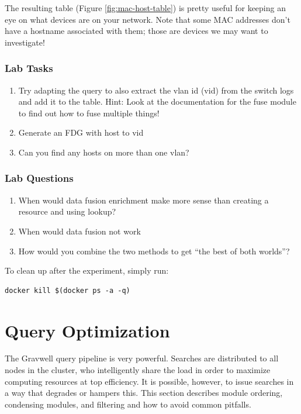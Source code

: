 The resulting table (Figure \ref{fig:mac-host-table}) is pretty useful for keeping an eye on what devices are on your network. Note that some MAC addresses don't have a hostname associated with them; those are devices we may want to investigate!

\subsubsection{Lab Tasks}

\begin{enumerate}
\item
  Try adapting the query to also extract the vlan id (vid) from the
  switch logs and add it to the table.
	\subitem Hint: Look at the documentation for the fuse module to find out how to fuse multiple things!
\item
  Generate an FDG with host to vid
\item
  Can you find any hosts on more than one vlan?
\end{enumerate}

\begin{samepage}
\subsubsection{Lab Questions}
\begin{enumerate}
\item
  {When would data fusion enrichment make more sense than creating a
  resource and using lookup?}
\item
  {When would data fusion not work}
\item
  {How would you combine the two methods to get ``the best of both
  worlds''?}
\end{enumerate}
\end{samepage}

To clean up after the experiment, simply run:

\begin{Verbatim}[breaklines=true]
docker kill $(docker ps -a -q)
\end{Verbatim}

\clearpage
\section{Query Optimization}
\label{sec:query-optimization}
The Gravwell query pipeline is very powerful. Searches are distributed
to all nodes in the cluster, who intelligently share the load in order to
maximize computing resources at top efficiency. It is possible, however,
to issue searches in a way that degrades or hampers this.
This section describes module ordering, condensing modules, and filtering
and how to avoid common pitfalls.

